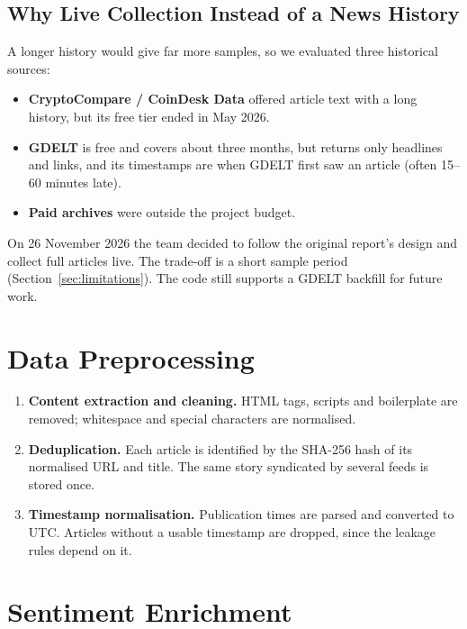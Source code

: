\documentclass[12pt,a4paper,oneside]{report}
\begin{document}
\subsection{Why Live Collection Instead of a News History}\label{sec:history}
A longer history would give far more samples, so we evaluated three
historical sources:
\begin{itemize}
  \item \textbf{CryptoCompare / CoinDesk Data} offered article text with a
        long history, but its free tier ended in May 2026.
  \item \textbf{GDELT} is free and covers about three months, but returns
        only headlines and links, and its timestamps are when GDELT first
        saw an article (often 15--60 minutes late).
  \item \textbf{Paid archives} were outside the project budget.
\end{itemize}
On 26 November 2026 the team decided to follow the original report's design
and collect full articles live. The trade-off is a short sample period
(Section~\ref{sec:limitations}). The code still supports a GDELT backfill
for future work.

\section{Data Preprocessing}
\begin{enumerate}
  \item \textbf{Content extraction and cleaning.} HTML tags, scripts and
        boilerplate are removed; whitespace and special characters are
        normalised.
  \item \textbf{Deduplication.} Each article is identified by the SHA-256
        hash of its normalised URL and title. The same story syndicated by
        several feeds is stored once.
  \item \textbf{Timestamp normalisation.} Publication times are parsed and
        converted to UTC. Articles without a usable timestamp are dropped,
        since the leakage rules depend on it.
\end{enumerate}

\section{Sentiment Enrichment}\label{sec:enrich}
\end{document}
